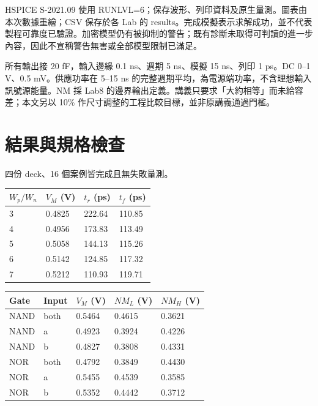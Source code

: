 HSPICE S-2021.09 使用 RUNLVL=6；保存波形、列印資料及原生量測。圖表由本次數據重繪；CSV 保存於各 Lab 的 results。完成模擬表示求解成功，並不代表製程可靠度已驗證。加密模型仍有被抑制的警告；既有診斷未取得可判讀的進一步內容，因此不宣稱警告無害或全部模型限制已滿足。

所有輸出接 20 fF，輸入邊緣 0.1 ns、週期 5 ns、模擬 15 ns、列印 1 ps。DC 0--1 V、0.5 mV。供應功率在 5--15 ns 的完整週期平均，為電源端功率，不含理想輸入訊號源能量。NM 採 Lab8 的邊界輸出定義。講義只要求「大約相等」而未給容差；本文另以 10\% 作尺寸調整的工程比較目標，並非原講義通過門檻。

\section{結果與規格檢查}
四份 deck、16 個案例皆完成且無失敗量測。
\begin{center}\small
\begin{tabular}{llll}
\toprule
$W_p/W_n$ & $V_M$ (V) & $t_r$ (ps) & $t_f$ (ps) \\
\midrule
3 & 0.4825 & 222.64 & 110.85 \\
4 & 0.4956 & 173.83 & 113.49 \\
5 & 0.5058 & 144.13 & 115.26 \\
6 & 0.5142 & 124.85 & 117.32 \\
7 & 0.5212 & 110.93 & 119.71 \\
\bottomrule
\end{tabular}
\end{center}
\begin{center}\small
\begin{tabular}{lllll}
\toprule
Gate & Input & $V_M$ (V) & $NM_L$ (V) & $NM_H$ (V) \\
\midrule
NAND & both & 0.5464 & 0.4615 & 0.3621 \\
NAND & a & 0.4923 & 0.3924 & 0.4226 \\
NAND & b & 0.4827 & 0.3808 & 0.4331 \\
NOR & both & 0.4792 & 0.3849 & 0.4430 \\
NOR & a & 0.5455 & 0.4539 & 0.3585 \\
NOR & b & 0.5352 & 0.4442 & 0.3712 \\
\bottomrule
\end{tabular}
\end{center}

